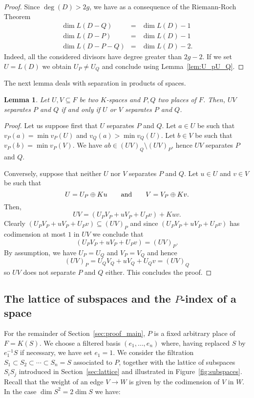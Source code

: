 \documentclass{article}
\theoremstyle{plain}
\newtheorem{lemma}[thm]{Lemma}
\theoremstyle{definition}
\theoremstyle{remark}
\begin{document}
\begin{proof}
  Since $\deg (D) > 2g$, we have as a consequence of the Riemann-Roch
  Theorem
  \begin{eqnarray*}
    \dim L(D-Q) &=& \dim L(D)-1\\
    \dim L(D-P) &=& \dim L(D)-1\\
    \dim L(D-P-Q) &=& \dim L(D)-2.
  \end{eqnarray*}
  Indeed, all the considered divisors have degree greater than $2g-2$.
  If we set $U = L(D)$ we obtain $U_P \neq U_Q$ and conclude using
  Lemma~\ref{lem:U_pU_Q}.
\end{proof}

The next lemma deals with separation in products of spaces.

\begin{lemma}\label{lem:sep_products}
Let $U, V \subseteq F$ be two $K$-spaces and $P, Q$ two places of $F$.
Then, $UV$ separates $P$ and $Q$ if and only if $U$ or $V$ separates
$P$ and $Q$. 
\end{lemma}

\begin{proof} Let us suppose first that $U$ separates $P$ and $Q$. 
Let $a \in U$ be such that $v_P(a) = \min v_P(U)$ and $v_Q(a) > \min v_Q(U)$.
Let $b \in V$ be such that $v_P(b) = \min v_P(V)$.
We have $ab \in (UV)_Q \setminus (UV)_P$, hence $UV$ separates $P$
and $Q$. 

Conversely, suppose that neither $U$ nor $V$ separates $P$ and $Q$. 
Let $u \in U$ and $v\in V$ be such that 
$$
U = U_P \oplus Ku \qquad {\rm and} \qquad V = V_P \oplus Kv.
$$
Then, 
$$
UV = (U_P V_P + uV_P + U_P v) + Kuv. 
$$
Clearly $(U_P V_P + uV_P + U_P v) \subseteq {(UV)}_P$ and since
$(U_P V_P + uV_P + U_P v)$ has codimension at most $1$ in $UV$ we conclude
that
$$
(U_P V_P + uV_P + U_P v) = {(UV)}_P.
$$
By assumption, we have $U_P = U_Q$ and $V_P = V_Q$ and hence
$$
{(UV)}_P = U_Q V_Q + u V_Q + U_Q v = {(UV)}_Q
$$
so $UV$ does not separate $P$ and $Q$ either. This concludes the proof.
\end{proof}

\subsection{The lattice of subspaces and the $P$-index of a space}
\label{sec:Pindex}

  For the remainder of Section~\ref{sec:proof_main}, $P$ is a fixed arbitrary place of
  $F=K(S)$. We choose a filtered basis
  $(e_1, \ldots, e_n)$ where, having replaced $S$ by $e_1^{-1}S$ if necessary,
  we have set $e_1=1$. We consider the 
  filtration $S_1 \subset S_2\subset \cdots \subset S_n = S$
  associated to $P$, together with the lattice of subspaces $S_iS_j$ introduced in
  Section~\ref{sec:lattice} and illustrated in
  Figure~\ref{fig:subspaces}.
  Recall that the weight of an edge $V\rightarrow W$ is given by the
  codimension of $V$ in $W$. In the case $\dim S^2=2\dim S$ we have:
\end{document}
